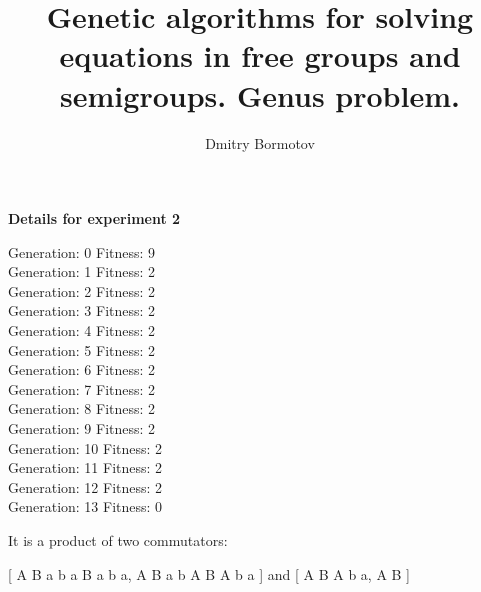 \documentclass{slides}
\title{Genetic algorithms for solving
equations in free groups and semigroups.  Genus problem.}
\author{Dmitry Bormotov} \date{}
\begin{document}
\pagestyle{empty}

\begin{center} \Large\textbf{Details for experiment 2} \end{center}

Generation: 0   Fitness: 9 \\
Generation: 1   Fitness: 2 \\
Generation: 2   Fitness: 2 \\
Generation: 3   Fitness: 2 \\
Generation: 4   Fitness: 2 \\
Generation: 5   Fitness: 2 \\
Generation: 6   Fitness: 2 \\
Generation: 7   Fitness: 2 \\
Generation: 8   Fitness: 2 \\
Generation: 9   Fitness: 2 \\
Generation: 10   Fitness: 2 \\
Generation: 11   Fitness: 2 \\
Generation: 12   Fitness: 2 \\
Generation: 13   Fitness: 0 

It is a product of two commutators:

[ A B a b a B a b a, A B a b A B A b a ] 
and [ A B A b a, A B ]
\end{document}
